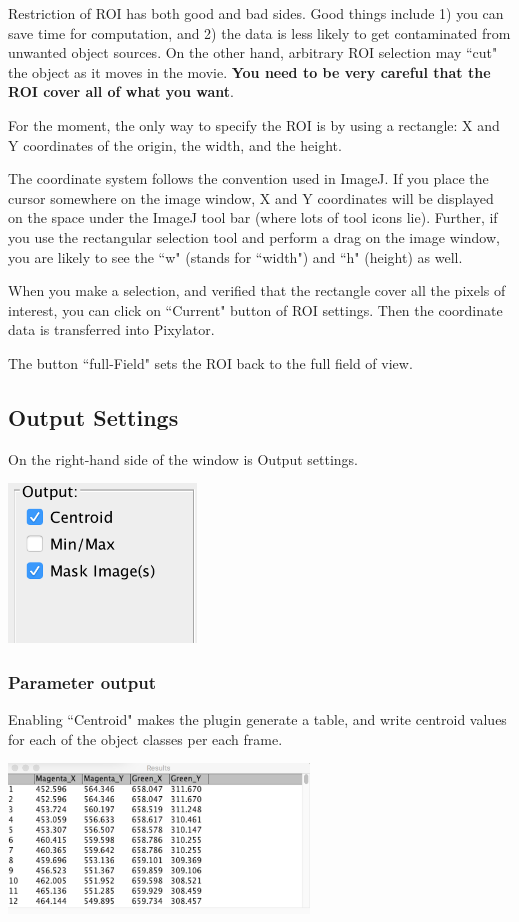 \documentclass[a4paper,oneside,10pt]{article}
\begin{document}
Restriction of ROI has both good and bad sides. Good things include 1) you can save time for computation, and 2) the data is less likely to get contaminated from unwanted object sources. On the other hand, arbitrary ROI selection may ``cut" the object as it moves in the movie. {\bf You need to be very careful that the ROI cover all of what you want}.


For the moment, the only way to specify the ROI is by using a rectangle: X and Y coordinates of the origin, the width, and the height.

The coordinate system follows the convention used in ImageJ. If you place the cursor somewhere on the image window, X and Y coordinates will be displayed on the space under the ImageJ tool bar (where lots of tool icons lie). Further, if you use the rectangular selection tool and perform a drag on the image window, you are likely to see the ``w" (stands for ``width") and ``h" (height) as well.

When you make a selection, and verified that the rectangle cover all the pixels of interest, you can click on ``Current" button of ROI settings. Then the coordinate data is transferred into Pixylator.

The button ``full-Field" sets the ROI back to the full field of view.


\subsection{Output Settings}
\label{sec:output}
On the right-hand side of the window is Output settings.

\includegraphics[width=5cm]{output.png}

\subsubsection{Parameter output}

Enabling ``Centroid" makes the plugin generate a table, and write centroid values for each of the object classes per each frame.

\includegraphics[width=8cm]{results.png}
\end{document}
